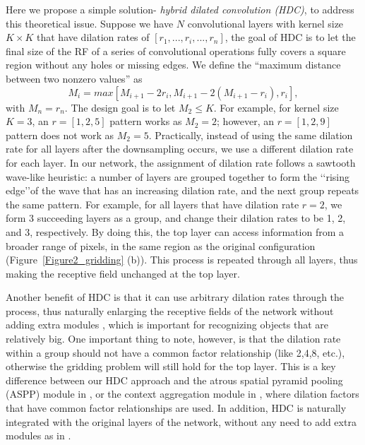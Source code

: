 \documentclass[10pt,twocolumn,letterpaper]{article}
\begin{document}
Here we propose a simple solution- \textit{hybrid dilated convolution (HDC)}, to address this theoretical issue. Suppose we have $N$ convolutional layers with kernel size $K\times K$ that have dilation rates of $[r_1,...,r_i,...,r_n]$, the goal of HDC is to let the final size of the RF of a series of convolutional operations fully covers a square region without any holes or missing edges. We define the ``maximum distance between two nonzero values'' as
\begin{equation}
M_i=max[M_{i+1}-2r_i,M_{i+1}-2(M_{i+1}-r_i),r_i],
\end{equation}
with $M_n=r_n$. The design goal is to let $M_2\leq K$. %
For example, for kernel size $K=3$, an $r=[1,2,5]$ pattern works as $M_2=2$; however, an $r=[1,2,9]$ pattern does not work as $M_2=5$. Practically, instead of using the same dilation rate for all layers after the downsampling occurs, we use a different dilation rate for each layer. In our network, the assignment of dilation rate follows a sawtooth wave-like heuristic: a number of layers are grouped together to form the \lq\lq rising edge\rq\rq of the wave that has an increasing dilation rate, and the next group repeats the same pattern. For example, for all layers that have dilation rate $r=2$, we form 3 succeeding layers as a group, and change their dilation rates to be 1, 2, and 3, respectively. By doing this, the top layer can access information from a broader range of pixels, in the same region as the original configuration (Figure~\ref{Figure2_gridding} (b)). This process is repeated through all layers, thus making the receptive field unchanged at the top layer.

Another benefit of HDC is that it can use arbitrary dilation rates through the process, thus naturally enlarging the receptive fields of the network without adding extra modules \cite{yu2015multi}, which is important for recognizing objects that are relatively big. One important thing to note, however, is that the dilation rate within a group should not have a common factor relationship (like 2,4,8, etc.), otherwise the gridding problem will still hold for the top layer. This is a key difference between our HDC approach and the atrous spatial pyramid pooling (ASPP) module in \cite{chen2016deeplab}, or the context aggregation module in \cite{yu2015multi}, where dilation factors that have common factor relationships are used. In addition, HDC is naturally integrated with the original layers of the network, without any need to add extra modules as in \cite{yu2015multi,chen2016deeplab}.
\end{document}
